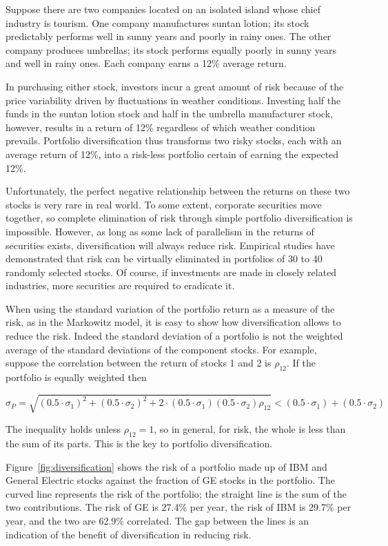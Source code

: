 Suppose there are two companies located on an isolated island whose chief industry is tourism. One company manufactures suntan lotion; its stock predictably performs well in sunny years and poorly in rainy ones. The other company produces umbrellas; its stock performs equally poorly in sunny years and well in rainy ones. Each company earns a 12\% average return.

In purchasing either stock, investors incur a great amount of risk because of the price variability driven by fluctuations in weather conditions. Investing half the funds in the suntan lotion stock and half in the umbrella manufacturer stock, however, results in a return of 12\% regardless of which weather condition prevails. Portfolio diversification thus transforms two risky stocks, each with an average return of 12\%, into a risk-less portfolio certain of earning the expected 12\%.

Unfortunately, the perfect negative relationship between the returns on these two stocks is very rare in real world. To some extent, corporate securities move together, so complete elimination of risk through simple portfolio diversification is impossible. However, as long as some lack of parallelism in the returns of securities exists, diversification will always reduce risk.
Empirical studies have demonstrated that risk can be virtually eliminated in portfolios of 30 to 40 randomly selected stocks. Of course, if investments are made in closely related industries, more securities are required to eradicate it.

When using the standard variation of the portfolio return as a measure of the risk, as in the Markowitz model, it is easy to show how diversification allows to reduce the risk. 
Indeed the standard deviation of a portfolio is not the weighted average of the standard deviations of the component stocks.
For example, suppose the correlation between the return of stocks 1 and 2 is $\rho_{12}$. If the portfolio is equally weighted then

\begin{equation}
\sigma_{P} = \sqrt{(0.5\cdot\sigma_1 )^2 + (0.5\cdot\sigma_2 )^2 + 2\cdot(0.5\cdot\sigma_1)(0.5\cdot\sigma_2)\rho_{12}} < (0.5\cdot\sigma_1 ) + (0.5\cdot\sigma_2 )
\end{equation}

The inequality holds unless $\rho_{12}=1$, so in general, for risk, the whole is less than the sum of its parts. 
This is the key to portfolio diversification.

Figure~\ref{fig:diversification} shows the risk of a portfolio made up of IBM and General Electric stocks against the fraction of GE stocks in the portfolio. The curved line represents the risk of the portfolio; the straight line is the sum of the two contributions. The risk of GE is 27.4\% per year, the risk of IBM is 29.7\% per year, and the two are 62.9\% correlated. The gap between the lines is an indication of the benefit of diversification in reducing risk.

